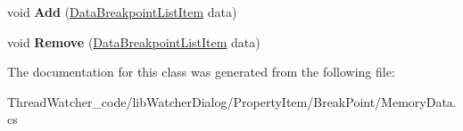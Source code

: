 \begin{DoxyCompactItemize}
\item 
\hypertarget{classlib_watcher_dialog_1_1_property_item_1_1_break_point_1_1_memory_data_ad5044c225df216f1426f066ebef4a49c}{void {\bfseries Add} (\hyperlink{classlib_watcher_dialog_1_1_list_1_1_data_breakpoint_list_item}{Data\+Breakpoint\+List\+Item} data)}\label{classlib_watcher_dialog_1_1_property_item_1_1_break_point_1_1_memory_data_ad5044c225df216f1426f066ebef4a49c}

\item 
\hypertarget{classlib_watcher_dialog_1_1_property_item_1_1_break_point_1_1_memory_data_a29f6608bd77652a7e111d33ed346d610}{void {\bfseries Remove} (\hyperlink{classlib_watcher_dialog_1_1_list_1_1_data_breakpoint_list_item}{Data\+Breakpoint\+List\+Item} data)}\label{classlib_watcher_dialog_1_1_property_item_1_1_break_point_1_1_memory_data_a29f6608bd77652a7e111d33ed346d610}

\end{DoxyCompactItemize}


The documentation for this class was generated from the following file\+:\begin{DoxyCompactItemize}
\item 
Thread\+Watcher\+\_\+code/lib\+Watcher\+Dialog/\+Property\+Item/\+Break\+Point/Memory\+Data.\+cs\end{DoxyCompactItemize}
